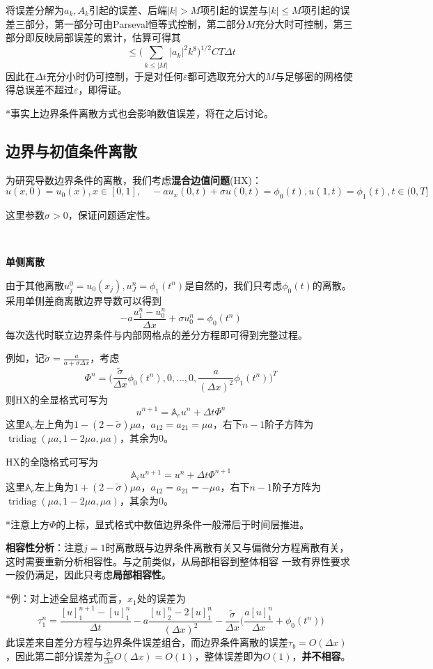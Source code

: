 \documentclass[a4paper,UTF8,fontset=windows]{ctexart}
\DeclareMathOperator{\tridiag}{tridiag}
\begin{document}
将误差分解为$a_k,A_k$引起的误差、后端$|k|>M$项引起的误差与$|k|\le M$项引起的误差三部分，第一部分可由Parseval恒等式控制，第二部分$M$充分大时可控制，第三部分即反映局部误差的累计，估算可得其
$$\le\bigg(\sum_{k\le|M|}|a_k|^2k^8\bigg)^{1/2}CT\Delta t$$
因此在$\Delta t$充分小时仍可控制，于是对任何$\varepsilon$都可选取充分大的$M$与足够密的网格使得总误差不超过$\varepsilon$，即得证。

*事实上边界条件离散方式也会影响数值误差，将在之后讨论。

\subsection{边界与初值条件离散}
为研究导数边界条件的离散，我们考虑\textbf{混合边值问题}(HX)：
$$u(x,0)=u_0(x),x\in[0,1],\quad -au_x(0,t)+\sigma u(0,t)=\phi_0(t),u(1,t)=\phi_1(t),t\in(0,T]$$

这里参数$\sigma>0$，保证问题适定性。

\

\textbf{单侧离散}

由于其他离散$u_j^0=u_0(x_j),u_J^n=\phi_1(t^n)$是自然的，我们只考虑$\phi_0(t)$的离散。采用单侧差商离散边界导数可以得到
$$-a\frac{u_1^n-u_0^n}{\Delta x}+\sigma u_0^n=\phi_0(t^n)$$
每次迭代时联立边界条件与内部网格点的差分方程即可得到完整过程。

例如，记$\tilde{\sigma}=\frac{a}{a+\sigma\Delta x}$，考虑
$$\Phi^n=\bigg(\frac{\tilde{\sigma}}{\Delta x}\phi_0(t^n),0,\dots,0,\frac{a}{(\Delta x)^2}\phi_1(t^n)\bigg)^T$$
则HX的全显格式可写为
$$u^{n+1}=\mathbb{A}_eu^n+\Delta t\Phi^n$$
这里$\mathbb{A}_e$左上角为$1-(2-\tilde{\sigma})\mu a$，$a_{12}=a_{21}=\mu a$，右下$n-1$阶子方阵为$\tridiag(\mu a,1-2\mu a,\mu a)$，其余为0。

HX的全隐格式可写为
$$\mathbb{A}_iu^{n+1}=u^n+\Delta t\Phi^{n+1}$$
这里$\mathbb{A}_e$左上角为$1+(2-\tilde{\sigma})\mu a$，$a_{12}=a_{21}=-\mu a$，右下$n-1$阶子方阵为$\tridiag(\mu a,1-2\mu a,\mu a)$，其余为0。

*注意上方$\Phi$的上标，显式格式中数值边界条件一般滞后于时间层推进。

\textbf{相容性分析}：注意$j=1$时离散既与边界条件离散有关又与偏微分方程离散有关，这时需要重新分析相容性。与之前类似，从局部相容到整体相容 一致有界性要求一般仍满足，因此只考虑\textbf{局部相容性}。

*例：对上述全显格式而言，$x_1$处的误差为
$$\tau_1^n=\frac{[u]_1^{n+1}-[u]_1^n}{\Delta t}-a\frac{[u]_2^n-2[u]_1^n}{(\Delta x)^2}-\frac{\tilde{\sigma}}{\Delta x}\bigg(\frac{a[u]_1^n}{\Delta x}+\phi_0(t^n)\bigg)$$
此误差来自差分方程与边界条件误差组合，而边界条件离散的误差$\tau_b=O(\Delta x)$，因此第二部分误差为$\frac{\tilde{\sigma}}{\Delta x}O(\Delta x)=O(1)$，整体误差即为$O(1)$，\textbf{并不相容}。
\end{document}
